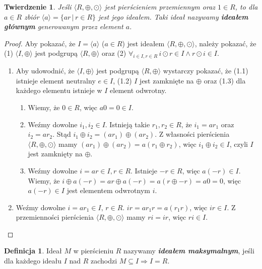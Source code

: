 \documentclass[polish,declaration,shortabstract]{iithesis}
\theoremstyle{definition}
\newtheorem{definition}{Definicja}
\theoremstyle{remark} \newtheorem{observation}{Obserwacja}
\theoremstyle{plain} \newtheorem{theorem}{Twierdzenie}
\theoremstyle{plain} \newtheorem{lemma}{Lemat}
\theoremstyle{remark} \newtheorem*{remark*}{Uwaga}
\theoremstyle{reminder} \newtheorem*{reminder*}{Przypomnienie}
\begin{document}
\theoremstyle{theorem}
\begin{theorem}
	Jeśli $\langle R, \oplus, \odot \rangle$ jest pierścieniem przemiennym oraz $1 \in R$, to dla $a \in R$ zbiór $\langle a \rangle = \{ ar \, | \, r \in R  \}$ jest jego ideałem. Taki ideał nazywamy \textit{\textbf{ideałem głównym}} generowanym przez element $a$.
\end{theorem}

\begin{proof}
	Aby pokazać, że $I = \langle a \rangle$ ($a \in R$) jest ideałem $\langle R, \oplus, \odot \rangle$, należy pokazać, że (1) $\langle I, \oplus \rangle$ jest podgrupą $\langle R, \oplus \rangle$ oraz (2) $\forall_{i \in I, r \in R} \, i \odot r \in I \wedge r \odot i \in I $.
	\begin{enumerate}[label={(\arabic*)}, leftmargin=.4in]
		\item Aby udowodnić, że $\langle I, \oplus \rangle$ jest podgrupą $\langle R, \oplus \rangle$ wystarczy pokazać, że (1.1) istnieje element neutralny $e \in I$, (1.2) $I$ jest zamknięte na $\oplus$ oraz (1.3) dla każdego elementu istnieje w $I$ element odwrotny.
		      \begin{enumerate}[label=(1.\arabic*)]
		      	\item Wiemy, że $0 \in R$, więc $a0=0 \in I$.
		      	\item Weźmy dowolne $i_1, i_2 \in I$. Istnieją takie $r_1, r_2 \in R$, że $i_1 = ar_1$ oraz $i_2 = ar_2$. Stąd $i_1 \oplus i_2 = (ar_1) \oplus (ar_2)$. Z własności pierścienia $\langle R, \oplus, \odot \rangle$ mamy $(ar_1) \oplus (ar_2) = a(r_1 \oplus r_2)$, więc $i_1 \oplus i_2 \in I$, czyli $I$ jest zamknięty na $\oplus$.
		      	\item Weźmy dowolne $i = ar \in I, r \in R$. Istnieje $-r \in R$, więc $a(-r) \in I$. Wiemy, że $i \oplus a(-r) = ar \oplus a(-r) = a(r \oplus -r) = a0 = 0$, więc $a(-r) \in I$ jest elementem odwrotnym $i$.
		      \end{enumerate}
		\item Weźmy dowolne $i = ar_1 \in I, \, r \in R$. $ir = ar_1r = a(r_1r)$, więc $ir \in I$. Z przemienności pierścienia $\langle R, \oplus, \odot \rangle$ mamy $ri = ir$, więc $ri \in I$.
	\end{enumerate}
\end{proof}

\theoremstyle{definition}
\begin{definition}
	Ideał $M$ w pierścieniu $R$ nazywamy \textit{\textbf{ideałem maksymalnym}}, jeśli dla każdego ideału $I$ nad $R$ zachodzi $M \subseteq I \Rightarrow I = R$.
\end{definition}
\end{document}
